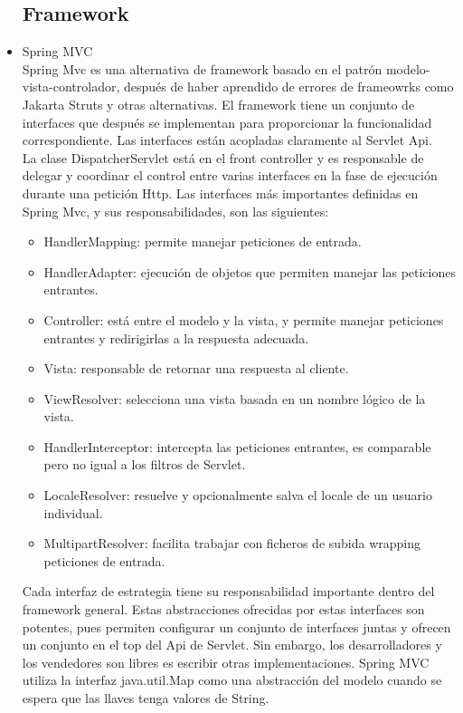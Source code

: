 \begin{itemize}
	\subsection{Framework}
		\item Spring MVC \\ 
		Spring Mvc es una alternativa de framework basado en el patrón modelo-vista-controlador, después de haber aprendido de errores de frameowrks como Jakarta Struts y otras alternativas.
		El framework tiene un conjunto de interfaces que después se implementan para proporcionar la funcionalidad correspondiente. Las interfaces están acopladas claramente al Servlet Api.\cite{spring}\\
		La clase DispatcherServlet está en el front controller y es responsable de delegar y coordinar el control entre varias interfaces en la fase de ejecución durante una petición Http.
		Las interfaces más importantes definidas en Spring Mvc, y sus responsabilidades, son las siguientes:
		\begin{itemize}
			\item HandlerMapping: permite manejar peticiones de entrada.
			\item HandlerAdapter: ejecución de objetos que permiten manejar las peticiones entrantes.
			\item Controller: está entre el modelo y la vista, y permite manejar peticiones entrantes y redirigirlas a la respuesta adecuada. 
			\item Vista: responsable de retornar una respuesta al cliente. 
			\item ViewResolver: selecciona una vista basada en un nombre lógico de la vista.
			\item HandlerInterceptor: intercepta las peticiones entrantes, es comparable pero no igual a los filtros de Servlet.
			\item LocaleResolver: resuelve y opcionalmente salva el locale de un usuario individual.
			\item MultipartResolver: facilita trabajar con ficheros de subida wrapping peticiones de entrada.
		\end{itemize}
		Cada interfaz de estrategia tiene su responsabilidad importante dentro del framework general. Estas abstracciones ofrecidas por estas interfaces son potentes, pues permiten configurar un conjunto de interfaces juntas y ofrecen un conjunto en el top del Api de Servlet. Sin embargo, los desarrolladores y los vendedores son libres es escribir otras implementaciones. Spring MVC utiliza la interfaz java.util.Map como una abstracción del modelo cuando se espera que las llaves tenga valores de String. \\

\end{itemize}
